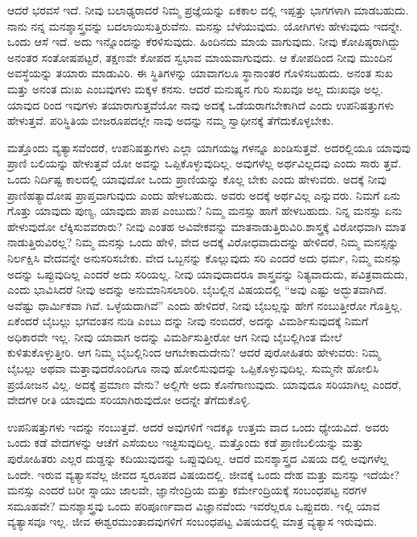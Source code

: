 ಆದರೆ ಭರವಸೆ ಇದೆ. ನೀವು ಬಲಾಢ್ಯರಾದರೆ ನಿಮ್ಮ ಪ್ರಜ್ಞೆಯನ್ನು ಏಕಕಾಲ ದಲ್ಲಿ ಇಪ್ಪತ್ತು ಭಾಗಗಳಾಗಿ ಮಾಡಬಹುದು. ನಾನು ನನ್ನ ಮನಶ್ಶಾಸ್ತ್ರವನ್ನು ಬದಲಾಯಿಸುತ್ತಿರುವೆನು. ಮನಸ್ಸು ಬೆಳೆಯುವುದು. ಯೋಗಿಗಳು ಹೇಳುವುದು ಇದನ್ನೇ. ಒಂದು ಆಸೆ ಇದೆ. ಅದು ಇನ್ನೊಂದನ್ನು ಕೆರಳಿಸುವುದು. ಹಿಂದಿನದು ಮಾಯ ವಾಗುವುದು. ನೀವು ಕೋಪಿಷ್ಠರಾಗಿದ್ದು ಅನಂತರ ಸಂತೋಷಪಟ್ಟರೆ, ತಕ್ಷಣವೇ ಕೋಪದ ಸ್ವಭಾವ ಮಾಯವಾಗುವುದು. ಆ ಕೋಪದಿಂದ ನೀವು ಮುಂದಿನ ಅವಸ್ಥೆಯನ್ನು ತಯಾರು ಮಾಡುವಿರಿ. ಈ ಸ್ಥಿತಿಗಳನ್ನು ಯಾವಾಗಲೂ ಸ್ಥಾನಾಂತರ ಗೊಳಿಸಬಹುದು. ಅನಂತ ಸುಖ ಮತ್ತು ಅನಂತ ದುಃಖ ಎಂಬವುಗಳು ಮಕ್ಕಳ ಕನಸು. ಆದರೆ ಮನುಷ್ಯನ ಗುರಿ ಸುಖವೂ ಅಲ್ಲ ದುಃಖವೂ ಅಲ್ಲ. ಯಾವುದ ರಿಂದ ಇವುಗಳು ತಯಾರಾಗುತ್ತವೆಯೋ ನಾವು ಅದಕ್ಕೆ ಒಡೆಯರಾಗಬೇಕಾಗಿದೆ ಎಂದು ಉಪನಿಷತ್ತುಗಳು ಹೇಳುತ್ತವೆ. ಪರಿಸ್ಥಿತಿಯ ಬೀಜರೂಪದಲ್ಲೇ ನಾವು ಅದನ್ನು ನಮ್ಮ ಸ್ವಾಧೀನಕ್ಕೆ ತೆಗೆದುಕೊಳ್ಳಬೇಕು.

ಮತ್ತೊಂದು ವ್ಯತ್ಯಾಸವೆಂದರೆ, ಉಪನಿಷತ್ತುಗಳು ಎಲ್ಲಾ ಯಾಗಯಜ್ಞ ಗಳನ್ನೂ ಖಂಡಿಸುತ್ತವೆ. ಅದರಲ್ಲಿಯೂ ಯಾವುವು ಪ್ರಾಣಿ ಬಲಿಯನ್ನು ಹೇಳುತ್ತವೆ ಯೋ ಅವನ್ನು ಒಪ್ಪಿಕೊಳ್ಳುವುದಿಲ್ಲ. ಅವುಗಳೆಲ್ಲ ಅರ್ಥವಿಲ್ಲದವು ಎಂದು ಸಾರು ತ್ತವೆ. ಒಂದು ನಿರ್ದಿಷ್ಟ ಕಾಲದಲ್ಲಿ ಯಾವುದೋ ಒಂದು ಪ್ರಾಣಿಯನ್ನು ಕೊಲ್ಲ ಬೇಕು ಎಂದು ಹೇಳುವರು. ಅದಕ್ಕೆ ನೀವು ಪ್ರಾಣಿಹತ್ಯಾದೋಷ ಪ್ರಾಪ್ತವಾಗುವುದು ಎಂದು ಹೇಳಬಹುದು. ಅವರು ಅದಕ್ಕೆ ಅರ್ಥವಿಲ್ಲ ಎನ್ನುವರು. ನಿಮಗೆ ಏನು ಗೊತ್ತು ಯಾವುದು ಪುಣ್ಯ, ಯಾವುದು ಪಾಪ ಎಂಬುದು? ನಿಮ್ಮ ಮನಸ್ಸು ಹಾಗೆ ಹೇಳಬಹುದು. ನಿನ್ನ ಮನಸ್ಸು ಏನು ಹೇಳುವುದೋ ಲೆಕ್ಕಿಸುವವರಾರು? ನೀವು ಎಂತಹ ಅವಿವೇಕವನ್ನು ಮಾತನಾಡುತ್ತಿರುವಿರಿ.ಶಾಸ್ತ್ರಕ್ಕೆ ವಿರೋಧವಾಗಿ ಮಾತ ನಾಡುತ್ತಿರುವಿರಲ್ಲ? ನಿಮ್ಮ ಮನಸ್ಸು ಒಂದು ಹೇಳಿ, ವೇದ ಅದಕ್ಕೆ ವಿರೋಧವಾದುದನ್ನು ಹೇಳಿದರೆ, ನಿಮ್ಮ ಮನಸ್ಸನ್ನು ನಿರ್ಲಕ್ಷಿಸಿ ವೇದವನ್ನೇ ಅನುಸರಿಸಬೇಕು. ವೇದ ಒಬ್ಬನನ್ನು ಕೊಲ್ಲುವುದು ಸರಿ ಎಂದರೆ ಅದು ಧರ್ಮ, ನಿಮ್ಮ ಮನಸ್ಸು ಅದನ್ನು ಒಪ್ಪುವುದಿಲ್ಲ ಎಂದರೆ ಅದು ಸರಿಯಲ್ಲ. ನೀವು ಯಾವುದಾದರೂ ಶಾಸ್ತ್ರವನ್ನು ನಿತ್ಯವಾದುದು, ಪವಿತ್ರವಾದುದು, ಎಂದು ಭಾವಿಸಿದರೆ ನೀವು ಅದನ್ನು ಅನುಮಾನಿಸಲಾರಿರಿ. ಬೈಬಲ್ಲಿನ ವಿಷಯದಲ್ಲಿ “ಅವು ಎಷ್ಟು ಅದ್ಭುತವಾಗಿದೆ. ಅವೆಷ್ಟು ಧಾರ್ಮಿಕವಾ ಗಿವೆ. ಒಳ್ಳೆಯದಾಗಿವೆ” ಎಂದು ಹೇಳಿದರೆ, ನೀವು ಬೈಬಲ್ಲನ್ನು ಹೇಗೆ ನಂಬುತ್ತೀರೋ ಗೊತ್ತಿಲ್ಲ. ಏಕೆಂದರೆ ಬೈಬಲ್ಲು ಭಗವಂತನ ನುಡಿ ಎಂಬು ದನ್ನು ನೀವು ನಂಬಿದರೆ, ಅದನ್ನು ವಿಮರ್ಶಿಸುವುದಕ್ಕೆ ನಿಮಗೆ ಅಧಿಕಾರವೇ ಇಲ್ಲ. ನೀವು ಯಾವಾಗ ಅದನ್ನು ವಿಮರ್ಶಿಸುತ್ತೀರೋ ಆಗ ನೀವು ಬೈಬಲ್ಲಿಗಿಂತ ಮೇಲೆ ಕುಳಿತುಕೊಳ್ಳುತ್ತೀರಿ. ಆಗ ನಿಮ್ಮ ಬೈಬಲ್ಲಿನಿಂದ ಆಗಬೇಕಾದುದೇನು? ಆದರೆ ಪುರೋಹಿತರು ಹೇಳುವರು: ನಿಮ್ಮ ಬೈಬಲ್ಲು ಅಥವಾ ಮತ್ತಾವುದರೊಂದಿಗೂ ನಾವು ಹೋಲಿಸುವುದನ್ನು ಒಪ್ಪಿಕೊಳ್ಳುವುದಿಲ್ಲ. ಸುಮ್ಮನೇ ಹೋಲಿಸಿ ಪ್ರಯೋಜನ ವಿಲ್ಲ. ಅದಕ್ಕೆ ಪ್ರಮಾಣ ವೇನು? ಅಲ್ಲಿಗೇ ಅದು ಕೊನೆಗಾಣುವುದು. ಯಾವುದೂ ಸರಿಯಾಗಿಲ್ಲ ಎಂದರೆ, ವೇದಗಳ ರೀತಿ ಯಾವುದು ಸರಿಯಾಗಿರುವುದೋ ಅದನ್ನೇ ತೆಗೆದುಕೊಳ್ಳಿ.

ಉಪನಿಷತ್ತುಗಳು ಇದನ್ನು ನಂಬುತ್ತವೆ. ಆದರೆ ಅವುಗಳಿಗೆ ಇದಕ್ಕೂ ಉತ್ತಮ ವಾದ ಒಂದು ಧ್ಯೇಯವಿದೆ. ಅವರು ಒಂದು ಕಡೆ ವೇದಗಳನ್ನು ಆಚೆಗೆ ಎಸೆಯಲು ಇಚ್ಛಿಸುವುದಿಲ್ಲ. ಮತ್ತೊಂದು ಕಡೆ ಪ್ರಾಣಿಬಲಿಯನ್ನು ಮತ್ತು ಪುರೋಹಿತರು ಎಲ್ಲರ ದುಡ್ಡನ್ನು ಕದಿಯುವುದನ್ನು ಒಪ್ಪುವುದಿಲ್ಲ. ಆದರೆ ಮನಶ್ಶಾಸ್ತ್ರದ ವಿಷಯ ದಲ್ಲಿ ಅವುಗಳೆಲ್ಲ ಒಂದೇ. ಇರುವ ವ್ಯತ್ಯಾಸವೆಲ್ಲ ಜೀವದ ಸ್ವರೂಪದ ವಿಷಯದಲ್ಲಿ. ಜೀವಕ್ಕೆ ಒಂದು ದೇಹ ಮತ್ತು ಮನಸ್ಸು ಇದೆಯೇ? ಮನಸ್ಸು ಎಂದರೆ ಬರೀ ಸ್ನಾಯು ಜಾಲವೇ, ಜ್ಞಾನೇಂದ್ರಿಯ ಮತ್ತು ಕರ್ಮೇಂದ್ರಿಯಕ್ಕೆ ಸಂಬಂಧಪಟ್ಟ ನರಗಳ ಸಮೂಹವೇ? ಮನಶ್ಶಾಸ್ತ್ರವು ಒಂದು ಪರಿಪೂರ್ಣವಾದ ವಿಜ್ಞಾನವೆಂದು ಇವರೆಲ್ಲರೂ ಒಪ್ಪುವರು. ಇಲ್ಲಿ ಯಾವ ವ್ಯತ್ಯಾಸವೂ ಇಲ್ಲ. ಜೀವ ಈಶ್ವರಮುಂತಾದವುಗಳಿಗೆ ಸಂಬಂಧಪಟ್ಟ ವಿಷಯದಲ್ಲಿ ಮಾತ್ರ ವ್ಯತ್ಯಾಸ ಇರುವುದು.

